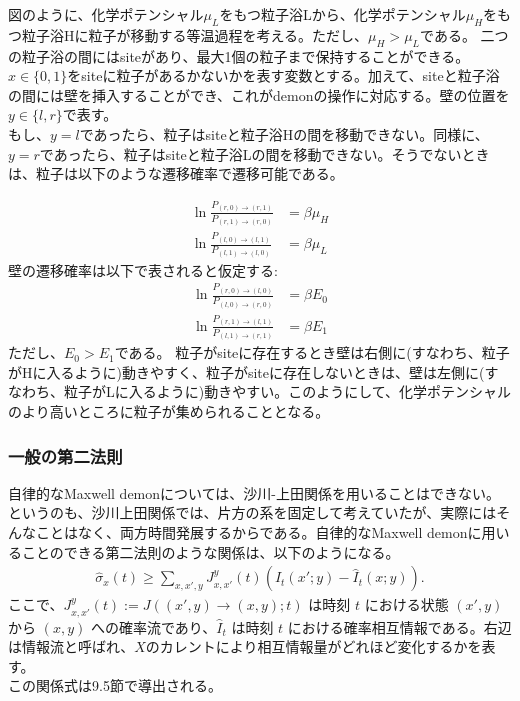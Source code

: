 \documentclass[a4paper,11pt]{jsarticle}
\numberwithin{equation}{section}
\begin{document}
図のように、化学ポテンシャル$\mu_L$をもつ粒子浴Lから、化学ポテンシャル$\mu_H$をもつ粒子浴Hに粒子が移動する等温過程を考える。ただし、$\mu_H > \mu_L$である。
二つの粒子浴の間にはsiteがあり、最大1個の粒子まで保持することができる。\\
$x \in \{0,1\}$をsiteに粒子があるかないかを表す変数とする。加えて、siteと粒子浴の間には壁を挿入することができ、これがdemonの操作に対応する。壁の位置を$y \in \{l,r\}$で表す。\\
もし、$y =l$であったら、粒子はsiteと粒子浴Hの間を移動できない。同様に、$y = r$であったら、粒子はsiteと粒子浴Lの間を移動できない。そうでないときは、粒子は以下のような遷移確率で遷移可能である。

\begin{align}
    \ln \frac{P_{(r,0) \to (r,1)}}{P_{(r,1) \to (r,0)}} &= \beta \mu_H \\
    \ln \frac{P_{(l,0) \to (l,1)}}{P_{(l,1) \to (l,0)}} &= \beta \mu_L 
\end{align}
壁の遷移確率は以下で表されると仮定する:
\begin{align}
    \ln \frac{P_{(r,0) \to (l,0)}}{P_{(l,0) \to (r,0)}} &= \beta E_0 \\
    \ln \frac{P_{(r,1) \to (l,1)}}{P_{(l,1) \to (r,1)}} &= \beta E_1 
\end{align}
ただし、$E_0 > E_1$である。%
粒子がsiteに存在するとき壁は右側に(すなわち、粒子がHに入るように)動きやすく、粒子がsiteに存在しないときは、壁は左側に(すなわち、粒子がLに入るように)動きやすい。このようにして、化学ポテンシャルのより高いところに粒子が集められることとなる。\\


\subsubsection{一般の第二法則}
自律的なMaxwell demonについては、沙川-上田関係を用いることはできない。というのも、沙川上田関係では、片方の系を固定して考えていたが、実際にはそんなことはなく、両方時間発展するからである。自律的なMaxwell demonに用いることのできる第二法則のような関係は、以下のようになる。
\begin{align}
    \hat{\sigma}_x(t) \geq \sum_{x,x',y} J^y_{x,x'}(t) \left( \hat{I}_t(x'; y) - \hat{I}_t(x; y) \right). \tag{9.44}
\end{align}
ここで、\(J^y_{x,x'}(t) := J((x', y) \to (x, y); t)\) は時刻 \(t\) における状態 \((x', y)\) から \((x, y)\) への確率流であり、\(\hat{I}_t\) は時刻 \(t\) における確率相互情報である。右辺は情報流と呼ばれ、$X$のカレントにより相互情報量がどれほど変化するかを表す。\\
この関係式は9.5節で導出される。\\
\end{document}
